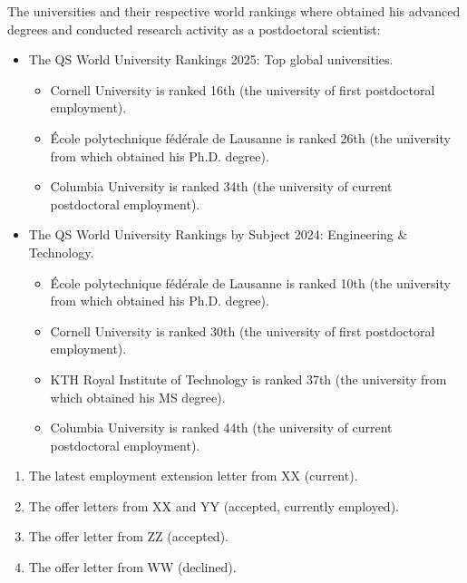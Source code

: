 \vspace{-7em}
The universities and their respective world rankings where \drfull obtained his
advanced degrees and conducted research activity as a postdoctoral scientist:
\begin{itemize}
	\item The QS World University Rankings 2025: Top global universities.
	\begin{itemize}
		\item Cornell University is ranked 16th (the university of \drs first
		postdoctoral employment).
		\item \'Ecole polytechnique f\'ed\'erale de Lausanne is ranked 26th (the
		university from which \dr obtained his Ph.D. degree).
		\item Columbia University is ranked 34th (the university of \drs current
		postdoctoral employment).
	\end{itemize}
	\item The QS World University Rankings by Subject 2024: Engineering \&
	Technology.
	\begin{itemize}
		\item \'Ecole polytechnique f\'ed\'erale de Lausanne is ranked 10th (the
		university from which \dr obtained his Ph.D. degree).
		\item Cornell University is ranked 30th (the university of \drs first
		postdoctoral employment).
		\item KTH Royal Institute of Technology is ranked 37th (the university
		from which \dr obtained his MS degree).
		\item Columbia University is ranked 44th (the university of \drs current
		postdoctoral employment).
	\end{itemize}
\end{itemize}

\vspace{-7em}
\begin{enumerate}
	\item The latest employment extension letter from XX (current).
	\item The offer letters from XX and YY (accepted, currently employed).
	\item The offer letter from ZZ (accepted).
	\item The offer letter from WW (declined).
\end{enumerate}

